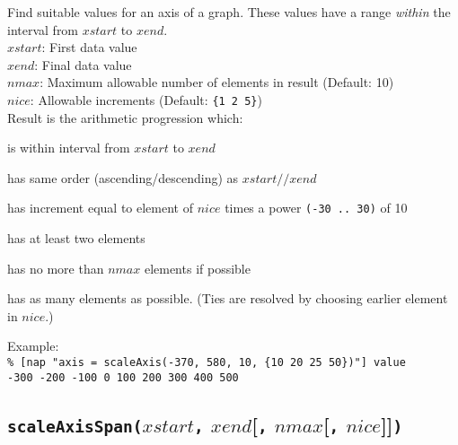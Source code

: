Find suitable values for an axis of a graph.
These values have a range \emph{within} the interval from $\mathit{xstart}$ to $\mathit{xend}$.
  \\
  $\mathit{xstart}$: First data value
  \\
  $\mathit{xend}$: Final data value
  \\
  $\mathit{nmax}$: Maximum allowable number of elements in result (Default: 10)
  \\
  $\mathit{nice}$: Allowable increments (Default: \texttt{\{1 2 5\}})
  \\Result is the arithmetic progression which:
  \begin{bullets}
    \item is within interval from $\mathit{xstart}$ to $\mathit{xend}$
    \item has same order (ascending/descending) as $\mathit{xstart} \texttt{//} \mathit{xend}$
    \item has increment equal to element of $\mathit{nice}$ times a power \texttt{(-30 .. 30)} of 10
    \item has at least two elements
    \item has no more than $\mathit{nmax}$ elements if possible
    \item has as many elements as possible.
	(Ties are resolved by choosing earlier element in $\mathit{nice}$.)
  \end{bullets}

Example:
  \\
  \texttt{\% [nap "axis = scaleAxis(-370, 580, 10, \{10 20 25
  50\})"] value
  \\-300 -200 -100 0 100 200 300 400 500}

\subsection{\texttt{scaleAxisSpan(}$\mathit{xstart}$\texttt{,}
$\mathit{xend}$[\texttt{,} $\mathit{nmax}$[\texttt{,} $\mathit{nice}$]]\texttt{)}}
    \label{nap-function-lib-scaleAxisSpan}

